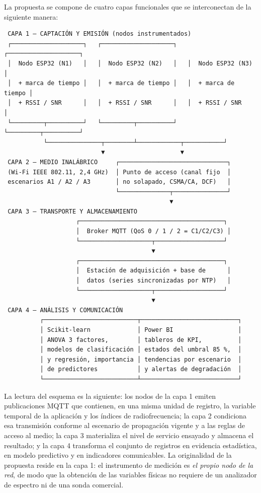 \documentclass[
  12pt,
]{article}
\begin{document}
La propuesta se compone de cuatro capas funcionales que se interconectan
de la siguiente manera:

\begin{verbatim}
 CAPA 1 — CAPTACIÓN Y EMISIÓN (nodos instrumentados)
 ┌────────────────────┐   ┌────────────────────┐   ┌────────────────────┐
 │  Nodo ESP32 (N1)   │   │  Nodo ESP32 (N2)   │   │  Nodo ESP32 (N3)   │
 │  + marca de tiempo │   │  + marca de tiempo │   │  + marca de tiempo │
 │  + RSSI / SNR      │   │  + RSSI / SNR      │   │  + RSSI / SNR      │
 └─────────┬──────────┘   └─────────┬──────────┘   └─────────┬──────────┘
           └───────────────┬────────┴────────────┬───────────┘
                           ▼                     ▼
 CAPA 2 — MEDIO INALÁBRICO     ┌──────────────────────────────┐
 (Wi-Fi IEEE 802.11, 2,4 GHz)  │ Punto de acceso (canal fijo  │
 escenarios A1 / A2 / A3       │ no solapado, CSMA/CA, DCF)   │
                               └──────────────┬───────────────┘
                                              ▼
 CAPA 3 — TRANSPORTE Y ALMACENAMIENTO
                    ┌────────────────────────────────────────┐
                    │  Broker MQTT (QoS 0 / 1 / 2 = C1/C2/C3) │
                    └────────────────────┬───────────────────┘
                                         ▼
                    ┌────────────────────────────────────────┐
                    │  Estación de adquisición + base de      │
                    │  datos (series sincronizadas por NTP)   │
                    └────────────────────┬───────────────────┘
                                         ▼
 CAPA 4 — ANÁLISIS Y COMUNICACIÓN
          ┌──────────────────────────┬───────────────────────────┐
          │ Scikit-learn             │ Power BI                  │
          │ ANOVA 3 factores,        │ tableros de KPI,          │
          │ modelos de clasificación │ estados del umbral 85 %,  │
          │ y regresión, importancia │ tendencias por escenario  │
          │ de predictores           │ y alertas de degradación  │
          └──────────────────────────┴───────────────────────────┘
\end{verbatim}

La lectura del esquema es la siguiente: los nodos de la capa 1 emiten
publicaciones MQTT que contienen, en una misma unidad de registro, la
variable temporal de la aplicación y los índices de radiofrecuencia; la
capa 2 condiciona esa transmisión conforme al escenario de propagación
vigente y a las reglas de acceso al medio; la capa 3 materializa el
nivel de servicio ensayado y almacena el resultado; y la capa 4
transforma el conjunto de registros en evidencia estadística, en modelo
predictivo y en indicadores comunicables. La originalidad de la
propuesta reside en la capa 1: el instrumento de medición es \emph{el
propio nodo de la red}, de modo que la obtención de las variables
físicas no requiere de un analizador de espectro ni de una sonda
comercial.
\end{document}
